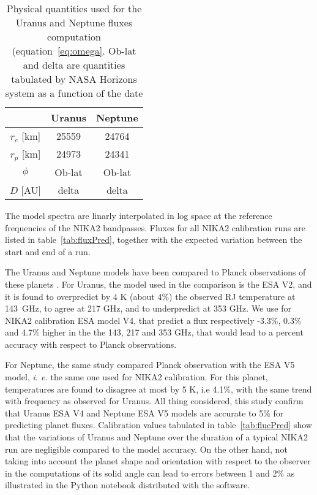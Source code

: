\begin{table}[ht]
\begin{center}
\begin{tabular}{|c|c|c|}
\hline
     & Uranus & Neptune \\
\hline
$r_{e}$ [km]  & 25559 & 24764 \\ 
\hline
$r_{p}$ [km]  & 24973 & 24341  \\
\hline
$\phi$         & Ob-lat & Ob-lat \\
\hline
$D$   [AU]    & delta   & delta \\
\hline
\end{tabular}
\end{center}
\caption{Physical quantities used for the Uranus and Neptune fluxes
  computation (equation~\ref{eq:omega}. Ob-lat and delta are quantities 
  tabulated by NASA Horizons system \cite{NASAHorizon} as a function of the date}
\label{tab:planetphysparam}
\end{table}



 
The model spectra are linarly interpolated in log space at the
reference frequencies of the NIKA2 bandpasses. Fluxes for all NIKA2
calibration runs are listed in table~\ref{tab:fluxPred}, together with
the expected variation between the start and end of a run. 

The Uranus and Neptune models have been compared to Planck
observations of these planets \cite{PLCK-LII}. For Uranus, the model used in the comparison
is the ESA V2, and it is found to overpredict by 4 K (about 4\%) the
observed RJ temperature at 143~GHz, to agree at 217 GHz, and
to underpredict at 353 GHz. We use for NIKA2 calibration ESA model V4,
that predict a flux respectively -3.3\%, 0.3\% and 4.7\% higher in the
the 143, 217 and 353 GHz, that would lead to a percent
accuracy with respect to Planck observations. 

For Neptune, the same study compared Planck observation with the ESA V5
model, {\it i. e.} the same one used for NIKA2 calibration. For this
planet, temperatures are found to disagree at most by 5 K, i.e 4.1\%,
with the same trend with frequency as observed for Uranus. All thing
considered, this study confirm that Uranus ESA V4 and Neptune ESA V5
models are accurate to 5\% for predicting planet fluxes. Calibration
values tabulated in table~\ref{tab:flucPred} show that the variations
of Uranus and Neptune over the duration of a typical NIKA2 run are
negligible compared to the model accuracy. On the other hand, not
taking into account the planet shape and orientation with respect to
the observer in the computations of its solid angle can lead to errors
between 1 and 2\% as illustrated in the Python notebook
\cite{gith-Haussel-Note}
distributed with the software. 



